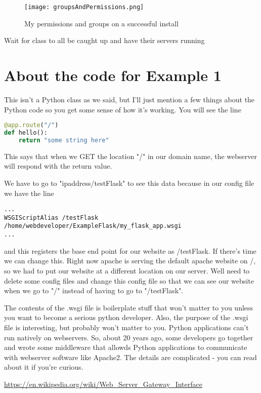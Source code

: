 \documentclass[10pt]{article}
\begin{document}
\begin{figure}[h]
  \centering
    \texttt{[image: groupsAndPermissions.png]}
  \caption{My permissions and groups on a successful install}
\end{figure}

{\LARGE Wait for class to all be caught up and have their servers running}

\section{About the code for Example 1}
This isn't a Python class as we said, but I'll just mention a few things about the Python code so you get some sense of how it's working. You will see the line

\begin{lstlisting}[language=Python]
@app.route("/")
def hello():
	return "some string here"
\end{lstlisting}
 
This says that when we GET the location "/" in our domain name, the webserver will respond with the return value.

We have to go to "ipaddress/testFlask" to see this data because in our config file we have the line

\begin{lstlisting}
...
WSGIScriptAlias /testFlask /home/webdeveloper/ExampleFlask/my_flask_app.wsgi
...
\end{lstlisting}

and this registers the base end point for our website as /testFlask. If there's time we can change this. Right now apache is serving the default apache website on /, so we had to put our website at a different location on our server. Well need to delete some config files and change this config file so that we can see our website when we go to "/" instead of having to go to "/testFlask".

The contents of the .wsgi file is boilerplate stuff that won't matter to you unless you want to become a serious python developer. Also, the purpose of the .wsgi file is interesting, but probably won't matter to you. Python applications can't run natively on webservers. So, about 20 years ago, some developers go together and wrote some middleware that allowds Python applications to communicate with webserver software like Apache2. The details are complicated - you can read about it if you're curious. 

\url{https://en.wikipedia.org/wiki/Web_Server_Gateway_Interface}
\end{document}
